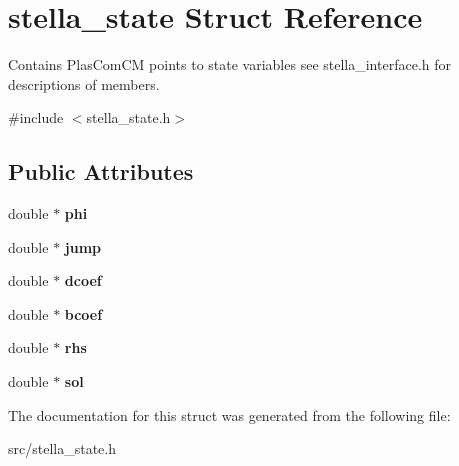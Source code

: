 \hypertarget{structstella__state}{}\section{stella\+\_\+state Struct Reference}
\label{structstella__state}


Contains Plas\+Com\+CM points to state variables see stella\+\_\+interface.\+h for descriptions of members.  




{\ttfamily \#include $<$stella\+\_\+state.\+h$>$}

\subsection*{Public Attributes}
\begin{DoxyCompactItemize}
\item 
\mbox{\label{structstella__state_a4f992ca5d0ac37d2f314d642667a292c}} 
double $\ast$ {\bfseries phi}
\item 
\mbox{\label{structstella__state_a835f723e4ea9b52295079c9b86d5f15d}} 
double $\ast$ {\bfseries jump}
\item 
\mbox{\label{structstella__state_ac52d39e3f4675d9abaf72800aa36af2c}} 
double $\ast$ {\bfseries dcoef}
\item 
\mbox{\label{structstella__state_af9015a59753fb223df5d20151fd04446}} 
double $\ast$ {\bfseries bcoef}
\item 
\mbox{\label{structstella__state_a11eb2dbbba860f01556c0f4ed067fa1b}} 
double $\ast$ {\bfseries rhs}
\item 
\mbox{\label{structstella__state_a44ba82bd7241e84bd5c9b3b179b19bb8}} 
double $\ast$ {\bfseries sol}
\end{DoxyCompactItemize}


The documentation for this struct was generated from the following file\+:\begin{DoxyCompactItemize}
\item 
src/stella\+\_\+state.\+h\end{DoxyCompactItemize}
